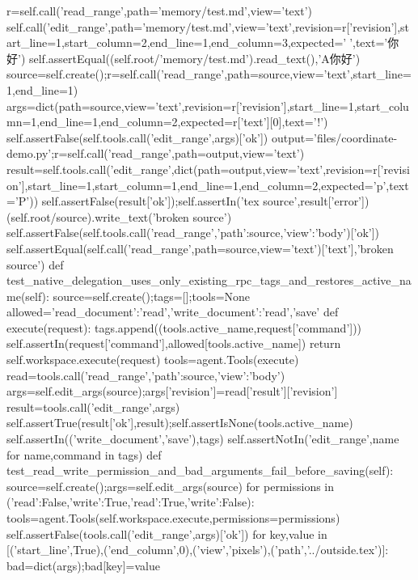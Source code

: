         r=self.call('read_range',path='memory/test.md',view='text')
        self.call('edit_range',path='memory/test.md',view='text',revision=r['revision'],start_line=1,start_column=2,end_line=1,end_column=3,expected='🧸',text='你好')
        self.assertEqual((self.root/'memory/test.md').read_text(),'A你好\nB')
        source=self.create();r=self.call('read_range',path=source,view='text',start_line=1,end_line=1)
        args=dict(path=source,view='text',revision=r['revision'],start_line=1,start_column=1,end_line=1,end_column=2,expected=r['text'][0],text='!')
        self.assertFalse(self.tools.call('edit_range',args)['ok'])
        output='files/coordinate-demo.py';r=self.call('read_range',path=output,view='text')
        result=self.tools.call('edit_range',dict(path=output,view='text',revision=r['revision'],start_line=1,start_column=1,end_line=1,end_column=2,expected='p',text='P'))
        self.assertFalse(result['ok']);self.assertIn('tex source',result['error'])
        (self.root/source).write_text('broken source')
        self.assertFalse(self.tools.call('read_range',{'path':source,'view':'body'})['ok'])
        self.assertEqual(self.call('read_range',path=source,view='text')['text'],'broken source')
    def test_native_delegation_uses_only_existing_rpc_tags_and_restores_active_name(self):
        source=self.create();tags=[];tools=None
        allowed={'read_document':{'read'},'write_document':{'read','save'}}
        def execute(request):
            tags.append((tools.active_name,request['command']))
            self.assertIn(request['command'],allowed[tools.active_name])
            return self.workspace.execute(request)
        tools=agent.Tools(execute)
        read=tools.call('read_range',{'path':source,'view':'body'})
        args=self.edit_args(source);args['revision']=read['result']['revision']
        result=tools.call('edit_range',args)
        self.assertTrue(result['ok'],result);self.assertIsNone(tools.active_name)
        self.assertIn(('write_document','save'),tags)
        self.assertNotIn('edit_range',{name for name,command in tags})
    def test_read_write_permission_and_bad_arguments_fail_before_saving(self):
        source=self.create();args=self.edit_args(source)
        for permissions in ({'read':False,'write':True},{'read':True,'write':False}):
            tools=agent.Tools(self.workspace.execute,permissions=permissions)
            self.assertFalse(tools.call('edit_range',args)['ok'])
        for key,value in [('start_line',True),('end_column',0),('view','pixels'),('path','../outside.tex')]:
            bad=dict(args);bad[key]=value
